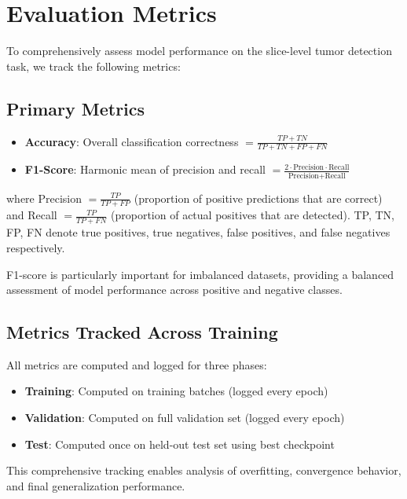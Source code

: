 \section{Evaluation Metrics}

To comprehensively assess model performance on the slice-level tumor detection task, we track the following metrics:

\subsection{Primary Metrics}

\begin{itemize}
    \item \textbf{Accuracy}: Overall classification correctness $= \frac{TP + TN}{TP + TN + FP + FN}$
    \item \textbf{F1-Score}: Harmonic mean of precision and recall $= \frac{2 \cdot \text{Precision} \cdot \text{Recall}}{\text{Precision} + \text{Recall}}$
\end{itemize}

where Precision $= \frac{TP}{TP + FP}$ (proportion of positive predictions that are correct) and Recall $= \frac{TP}{TP + FN}$ (proportion of actual positives that are detected). TP, TN, FP, FN denote true positives, true negatives, false positives, and false negatives respectively.

F1-score is particularly important for imbalanced datasets, providing a balanced assessment of model performance across positive and negative classes.

\subsection{Metrics Tracked Across Training}

All metrics are computed and logged for three phases:
\begin{itemize}
    \item \textbf{Training}: Computed on training batches (logged every epoch)
    \item \textbf{Validation}: Computed on full validation set (logged every epoch)
    \item \textbf{Test}: Computed once on held-out test set using best checkpoint
\end{itemize}

This comprehensive tracking enables analysis of overfitting, convergence behavior, and final generalization performance.

